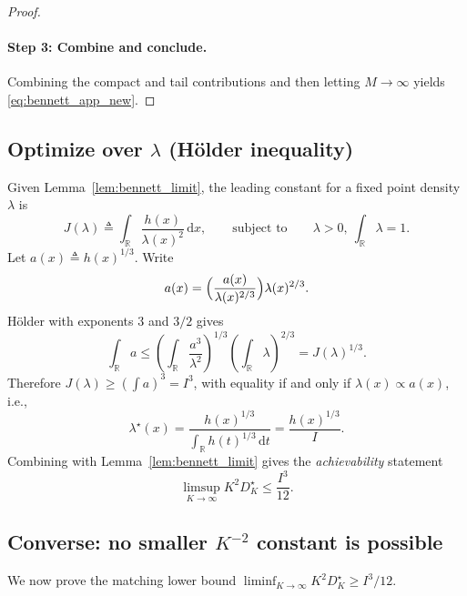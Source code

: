 \documentclass{article}
\newcommand{\R}{\mathbb{R}}
\newcommand{\dd}{\,\mathrm{d}}
\newcommand{\defeq}{\triangleq}
\begin{document}
\begin{proof}
\paragraph*{Step 3: Combine and conclude.}
Combining the compact and tail contributions and then letting $M\to\infty$ yields \eqref{eq:bennett_app_new}.
\end{proof}

\subsection{Optimize over $\lambda$ (H\"older inequality)}
Given Lemma~\ref{lem:bennett_limit}, the leading constant for a fixed point density $\lambda$ is
\[
J(\lambda)\defeq \int_{\R}\frac{h(x)}{\lambda(x)^2}\dd x,
\qquad \text{subject to}\qquad \lambda>0,\ \int_\R \lambda=1.
\]
Let $a(x)\defeq h(x)^{1/3}$. Write
\[
a(x)=\Bigl(\frac{a(x)}{\lambda(x)^{2/3}}\Bigr)\lambda(x)^{2/3}.
\]
H\"older with exponents $3$ and $3/2$ gives
\[
\int_{\R} a
\le \left(\int_{\R} \frac{a^3}{\lambda^2}\right)^{1/3}\left(\int_{\R}\lambda\right)^{2/3}
= J(\lambda)^{1/3}.
\]
Therefore $J(\lambda)\ge (\int a)^3 = I^3$, with equality if and only if $\lambda(x)\propto a(x)$, i.e.,
\begin{equation}\label{eq:lambda_star_scalar}
\lambda^\star(x)=\frac{h(x)^{1/3}}{\int_\R h(t)^{1/3}\dd t}=\frac{h(x)^{1/3}}{I}.
\end{equation}
Combining with Lemma~\ref{lem:bennett_limit} gives the \emph{achievability} statement
\begin{equation}\label{eq:achievability_scalar}
\limsup_{K\to\infty} K^2 D_K^\star \le \frac{I^3}{12}.
\end{equation}

\subsection{Converse: no smaller $K^{-2}$ constant is possible}\label{app:scalar_converse}
We now prove the matching lower bound $\liminf_{K\to\infty}K^2D_K^\star\ge I^3/12$.
\end{document}
